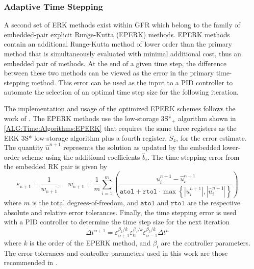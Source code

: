 \subsubsection{Adaptive Time Stepping}
\label{SEC:Time:Algorithms:Adaptive}

A second set of ERK methods exist within GFR which belong to the family of
embedded-pair explicit Runge-Kutta (EPERK) methods.
%
EPERK methods contain an additional Runge-Kutta method of lower order than the
primary method that is simultaneously evaluated with minimal additional cost,
thus an embedded pair of methods.
%
At the end of a given time step, the difference between these two methods can be
viewed as the error in the primary time-stepping method.
%
This error can be used as the input to a PID controller to automate the
selection of an optimal time step size for the following
iteration.\cite{Berzins_1995,Ware_1995,Ranocha_2022}


The implementation and usage of the optimized EPERK schemes follows the work of
.
%
The EPERK methods use the low-storage 3S*$\!{}_+$ algorithm shown in
\cref{ALG:Time:Algorithms:EPERK} that requires the same three registers as the
ERK 3S* low-storage algorithm plus a fourth register, $S_4$, for the error
estimate.
%
%
The quantity $\hat{u}^{n+1}$ represents the solution as updated by the embedded
lower-order scheme using the additional coefficients $\hat{b}_i$.
%
The time stepping error from the embedded RK pair is given by
%
\begin{equation*}
  \varepsilon_{n+1} = \frac{1}{w_{n+1}},\quad
  w_{n+1} = \frac{1}{m} \sum_{i=1}^m \left( 
     \frac{u_i^{n+1} - \hat{u}_i^{n+1}}
          {\mathtt{atol}+\mathtt{rtol}\!\cdot\!
           \max\left\{\left|u_i^{n+1}\right|,
                      \left|\hat{u}_i^{n+1}\right|\right\}}
          \right)
\end{equation*}
%
where $m$ is the total degrees-of-freedom, and $\mathtt{atol}$ and
$\mathtt{rtol}$ are the respective absolute and relative error tolerances.
%
Finally, the time stepping error is used with a PID controller to determine the
time step size for the next iteration
%
\begin{equation*}
  \Delta t^{n+1} = \varepsilon^{\beta_{1} / k}_{n+1}
                   \varepsilon^{\beta_{2} / k}_{n}
                   \varepsilon^{\beta_{3} / k}_{n-1} \Delta t^n
\end{equation*}
%
where $k$ is the order of the EPERK method, and $\beta_{i}$ are the controller
parameters.
%
The error tolerances and controller parameters used in this work are those
recommended in .

